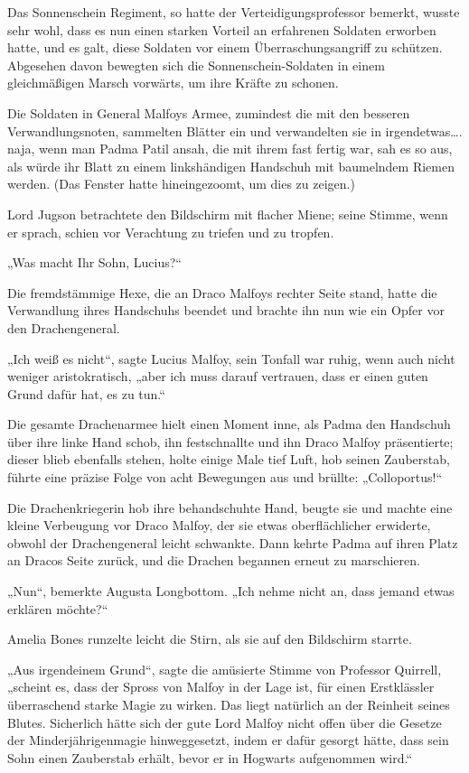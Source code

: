 {Das Sonnenschein Regiment, so hatte der Verteidigungsprofessor bemerkt, wusste sehr wohl, dass es nun einen starken Vorteil an erfahrenen Soldaten erworben hatte, und es galt, diese Soldaten vor einem Überraschungsangriff zu schützen. Abgesehen davon bewegten sich die Sonnenschein-Soldaten in einem gleichmäßigen Marsch vorwärts, um ihre Kräfte zu schonen.

Die Soldaten in General Malfoys Armee, zumindest die mit den besseren Verwandlungsnoten, sammelten Blätter ein und verwandelten sie in irgendetwas…. naja, wenn man Padma Patil ansah, die mit ihrem fast fertig war, sah es so aus, als würde ihr Blatt zu einem linkshändigen Handschuh mit baumelndem Riemen werden. (Das Fenster hatte hineingezoomt, um dies zu zeigen.)

Lord Jugson betrachtete den Bildschirm mit flacher Miene; seine Stimme, wenn er sprach, schien vor Verachtung zu triefen und zu tropfen.

„Was macht Ihr Sohn, Lucius?“

Die fremdstämmige Hexe, die an Draco Malfoys rechter Seite stand, hatte die Verwandlung ihres Handschuhs beendet und brachte ihn nun wie ein Opfer vor den Drachengeneral.

„Ich weiß es nicht“, sagte Lucius Malfoy, sein Tonfall war ruhig, wenn auch nicht weniger aristokratisch, „aber ich muss darauf vertrauen, dass er einen guten Grund dafür hat, es zu tun.“

Die gesamte Drachenarmee hielt einen Moment inne, als Padma den Handschuh über ihre linke Hand schob, ihn festschnallte und ihn Draco Malfoy präsentierte; dieser blieb ebenfalls stehen, holte einige Male tief Luft, hob seinen Zauberstab, führte eine präzise Folge von acht Bewegungen aus und brüllte: „Colloportus!“

Die Drachenkriegerin hob ihre behandschuhte Hand, beugte sie und machte eine kleine Verbeugung vor Draco Malfoy, der sie etwas oberflächlicher erwiderte, obwohl der Drachengeneral leicht schwankte. Dann kehrte Padma auf ihren Platz an Dracos Seite zurück, und die Drachen begannen erneut zu marschieren.

„Nun“, bemerkte Augusta Longbottom. „Ich nehme nicht an, dass jemand etwas erklären möchte?“

Amelia Bones runzelte leicht die Stirn, als sie auf den Bildschirm starrte.

„Aus irgendeinem Grund“, sagte die amüsierte Stimme von Professor Quirrell, „scheint es, dass der Spross von Malfoy in der Lage ist, für einen Erstklässler überraschend starke Magie zu wirken. Das liegt natürlich an der Reinheit seines Blutes. Sicherlich hätte sich der gute Lord Malfoy nicht offen über die Gesetze der Minderjährigenmagie hinweggesetzt, indem er dafür gesorgt hätte, dass sein Sohn einen Zauberstab erhält, bevor er in Hogwarts aufgenommen wird.“

}
